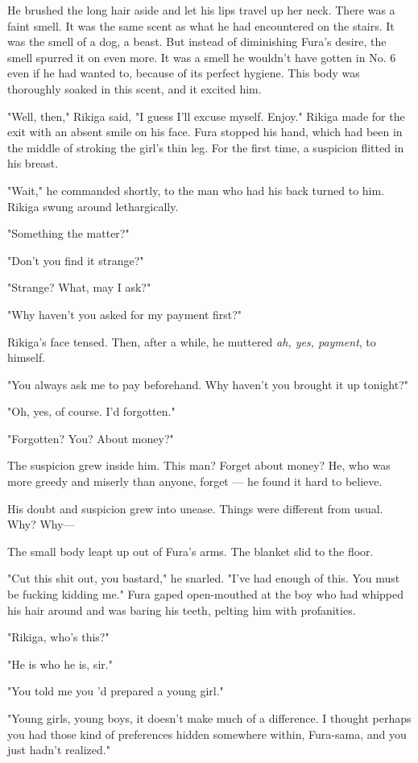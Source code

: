 He brushed the long hair aside and let his lips travel up her neck.
There was a faint smell. It was the same scent as what he had
encountered on the stairs. It was the smell of a dog, a beast. But
instead of diminishing Fura's desire, the smell spurred it on even more.
It was a smell he wouldn't have gotten in No. 6 even if he had wanted
to, because of its perfect hygiene. This body was thoroughly soaked in
this scent, and it excited him.

"Well, then," Rikiga said, "I guess I'll excuse myself. Enjoy." Rikiga
made for the exit with an absent smile on his face. Fura stopped his
hand, which had been in the middle of stroking the girl's thin leg. For
the first time, a suspicion flitted in his breast.

"Wait," he commanded shortly, to the man who had his back turned to him.
Rikiga swung around lethargically.

"Something the matter?"

"Don't you find it strange?"

"Strange? What, may I ask?"

"Why haven't you asked for my payment first?"

Rikiga's face tensed. Then, after a while, he muttered \emph{ah, yes, payment},
to himself.

"You always ask me to pay beforehand. Why haven't you brought it up
tonight?"

"Oh, yes, of course. I'd forgotten."

"Forgotten? You? About money?"

The suspicion grew inside him. This man? Forget about money? He, who was
more greedy and miserly than anyone, forget --- he found it hard to
believe.

His doubt and suspicion grew into unease. Things were different from
usual. Why? Why---

The small body leapt up out of Fura's arms. The blanket slid to the
floor.

"Cut this shit out, you bastard," he snarled. "I've had enough of this.
You must be fucking kidding me." Fura gaped open-mouthed at the boy who
had whipped his hair around and was baring his teeth, pelting him with
profanities.

"Rikiga, who's this?"

"He is who he is, sir."

"You told me you 'd prepared a young girl."

"Young girls, young boys, it doesn't make much of a difference. I
thought perhaps you had those kind of preferences hidden somewhere
within, Fura-sama, and you just hadn't realized."

